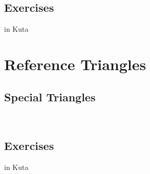 \subsection{Exercises}
in Kuta



\newpage
\section{Reference Triangles}
\noindent{}
\subsection{Special Triangles}

~\vfill
\newpage
\subsection{Exercises}
in Kuta
~\vfill

